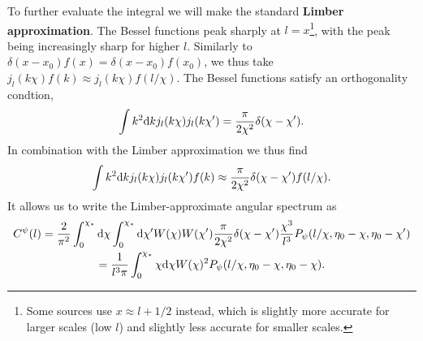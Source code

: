 \documentclass[11pt]{article} %
\DeclareRobustCommand{\d}{\ifmmode\text{d}\else d\fi}
\begin{document}
To further evaluate the integral we will make the standard \textbf{Limber approximation}. The Bessel functions peak sharply at $l=x$\footnote{Some sources use $x\approx l+1/2$ instead, which is slightly more accurate for larger scales (low $l$) and slightly less accurate for smaller scales.}, with the peak being increasingly sharp for higher $l$. Similarly to $\delta(x-x_0)f(x)=\delta(x-x_0)f(x_0)$, we thus take $j_l(k\chi)f(k)\approx j_l(k\chi)f(l/\chi)$. The Bessel functions satisfy an orthogonality condtion,
\begin{equation}
    \int k^2\d k j_l(k\chi)j_l(k\chi') = \frac{\pi}{2\chi^2}\delta(\chi-\chi').
\end{equation}
In combination with the Limber approximation we thus find
\begin{equation}
    \int k^2\d k j_l(k\chi)j_l(k\chi')f(k) \approx \frac{\pi}{2\chi^2}\delta(\chi-\chi')f(l/\chi).
\end{equation}
It allows us to write the Limber-approximate angular spectrum as
\begin{gather}
    C^\psi(l) = \frac{2}{\pi^2}\int_0^{\chi_*}\d \chi\int_0^{\chi_*}\d \chi' W(\chi)W(\chi') \frac{\pi}{2\chi^2}\delta(\chi-\chi')\frac{\chi^3}{l^3}P_\psi(l/\chi,\eta_0 - \chi, \eta_0-\chi')\\
    = \frac{1}{l^3\pi}\int_0^{\chi_*}\chi\d \chi W(\chi)^2 P_\psi(l/\chi,\eta_0 - \chi, \eta_0-\chi).
\end{gather}
\end{document}
